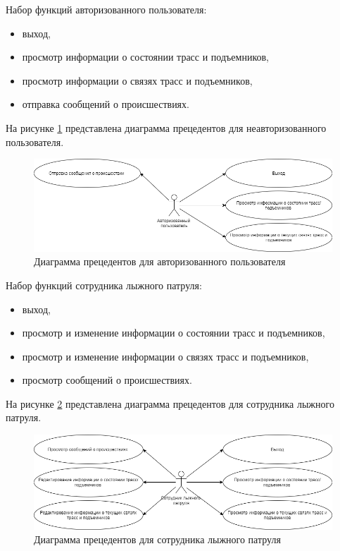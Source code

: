 	
	
	
	
Набор функций авторизованного пользователя:
	\begin{itemize}
		\item выход,
		\item просмотр информации о состоянии трасс и подъемников,
		\item просмотр информации о связях трасс и подъемников,
		\item отправка сообщений о происшествиях.
	\end{itemize}

\clearpage
На рисунке \ref{img:use_case2} представлена диаграмма прецедентов  для неавторизованного пользователя.

\begin{figure}[h!]
	\begin{center}
		\includegraphics[scale=0.5]{../imgs/use_case/use-case2.png}
	\end{center}
	\captionsetup{justification=centering}
	\caption{Диаграмма прецедентов для авторизованного пользователя\\}
	\label{img:use_case2}
\end{figure}

	
Набор функций сотрудника лыжного патруля:
	\begin{itemize}
		\item выход,
		\item просмотр и изменение информации о состоянии трасс и подъемников,
		\item просмотр и изменение информации о связях трасс и подъемников,
		\item просмотр сообщений о происшествиях.
	\end{itemize}

На рисунке \ref{img:use_case3} представлена диаграмма прецедентов  для сотрудника лыжного патруля.

\begin{figure}[h!]
	\begin{center}
		\includegraphics[scale=0.5]{../imgs/use_case/use-case3.png}
	\end{center}
	\captionsetup{justification=centering}
	\caption{Диаграмма прецедентов для сотрудника лыжного патруля}
	\label{img:use_case3}
\end{figure}
	

